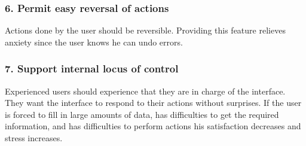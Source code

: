 \subsubsection{6. Permit easy reversal of actions}
Actions done by the user should be reversible. Providing this feature relieves anxiety since the user knows he can undo errors.

\subsubsection{7. Support internal locus of control}
Experienced users should experience that they are in charge of the interface. They want the interface to respond to their actions without surprises. If the user is forced to fill in large amounts of data, has difficulties to get the required information, and has difficulties to perform actions his satisfaction decreases and stress increases.